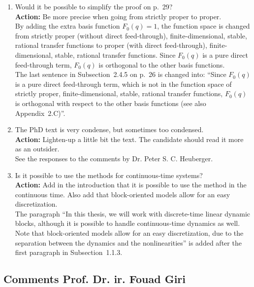\documentclass{article}
\newenvironment{answer}{\noindent\ignorespaces\color{blue}}{\noindent\ignorespacesafterend}
\newcommand{\ans}[1]{\begin{answer}#1\end{answer}}
\newcommand{\action}[1]{\textbf{Action:} #1}
\newcommand{\oldnewpage}[2]{\marginpar{{\color{black}#1} / {\color{red}#2}}}
\begin{document}
\begin{enumerate}
	\item Would it be possible to simplify the proof on p.~29?\\
		\action{Be more precise when going from strictly proper to proper.}\\
		\ans{By adding the extra basis function \mbox{$F_0(q) = 1$}, the function space is changed from strictly proper (without direct feed-through), finite-dimensional, stable, rational transfer functions to proper (with direct feed-through), finite-dimensional, stable, rational transfer functions. Since $F_0(q)$ is a pure direct feed-through term, $F_0(q)$ is orthogonal to the other basis functions.\\
		\oldnewpage{26}{28}The last sentence in Subsection~2.4.5 on p.~26 is changed into: ``Since $F_0(q)$ is a pure direct feed-through term, which is not in the function space of strictly proper, finite-dimensional, stable, rational transfer functions, $F_0(q)$ is orthogonal with respect to the other basis functions (see also Appendix~2.C)''.}

	\item The PhD text is very condense, but sometimes too condensed.\\
		\action{Lighten-up a little bit the text. The candidate should read it more as an outsider.}\\
		\ans{See the responses to the comments by Dr. Peter S. C. Heuberger.}

	\item Is it possible to use the methods for continuous-time systems?\\
		\action{Add in the introduction that it is possible to use the method in the continuous time. Also add that block-oriented models allow for an easy discretization.}\\
		\ans{\oldnewpage{5}{5}The paragraph ``In this thesis, we will work with discrete-time linear dynamic blocks, although it is possible to handle continuous-time dynamics as well. Note that block-oriented models allow for an easy discretization, due to the separation between the dynamics and the nonlinearities'' is added after the first paragraph in Subsection~1.1.3.}
\end{enumerate}

\subsection*{Comments Prof. Dr. ir. Fouad Giri}
\end{document}
